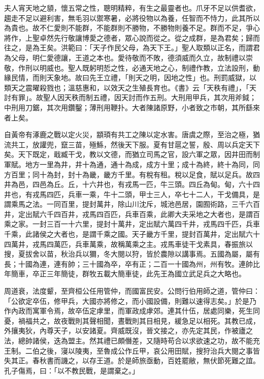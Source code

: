 
\begin{pinyinscope}
夫人宵天地之䫉，懷五常之性，聰明精粹，有生之最靈者也。爪牙不足以供耆欲，趨走不足以避利害，無毛羽以禦寒暑，必將役物以為養，任智而不恃力，此其所以為貴也。故不仁愛則不能群，不能群則不勝物，不勝物則養不足。群而不足，爭心將作，上聖卓然先行敬讓博愛之德者，眾心說而從之。從之成群，是為君矣；歸而往之，是為王矣。洪範曰：「天子作民父母，為天下王。」聖人取類以正名，而謂君為父母，明仁愛德讓，王道之本也。愛待敬而不敗，德須威而久立，故制禮以崇敬，作刑以明威也。聖人既躬明悊之性，必通天地之心，制禮作教，立法設刑，動緣民情，而則天象地。故曰先王立禮，「則天之明，因地之性」也。刑罰威獄，以類天之震曜殺戮也；溫慈惠和，以效天之生殖長育也。《書》云「天秩有禮」，「天討有罪」。故聖人因天秩而制五禮，因天討而作五刑。大刑用甲兵，其次用斧鉞；中刑用刀鋸，其次用鑽鑿；薄刑用鞭扑。大者陳諸原野，小者致之市朝，其所繇來者上矣。

自黃帝有涿鹿之戰以定火災，顓頊有共工之陳以定水害。唐虞之際，至治之極，猶流共工，放讙兜，竄三苗，殛鯀，然後天下服。夏有甘扈之誓，殷、周以兵定天下矣。天下既定，戢臧干戈，教以文德，而猶立司馬之官，設六軍之眾，因井田而制軍賦。地方一里為井，井十為通，通十為成，成方十里；成十為終，終十為同，同方百里；同十為封，封十為畿，畿方千里。有稅有租。稅以足食，賦以足兵。故四井為邑，四邑為丘。丘，十六井也，有戎馬一匹，牛三頭。四丘為甸。甸，六十四井也，有戎馬四匹，兵車一乘，牛十二頭，甲士三人，卒七十二人，干戈備具，是謂乘馬之法。一同百里，提封萬井，除山川沈斥，城池邑居，園囿術路，三千六百井，定出賦六千四百井，戎馬四百匹，兵車百乘，此卿大夫采地之大者也，是謂百乘之家。一封三百一十六里，提封十萬井，定出賦六萬四千井，戎馬四千匹，兵車千乘，此諸侯之大者也，是謂千乘之國。天子畿方千里，提封百萬井，定出賦六十四萬井，戎馬四萬匹，兵車萬乘，故稱萬乘之主。戎馬車徒干戈素具，春振旅以搜，夏拔舍以苗，秋治兵以獮，冬大閱以狩，皆於農隙以講事焉。五國為屬，屬有長；十國為連，連有帥；三十國為卒，卒有正；二百一十國為州，州有牧。連帥比年簡車，卒正三年簡徒，群牧五載大簡車徒，此先王為國立武足兵之大略也。

周道衰，法度颦，至齊桓公任用管仲，而國富民安。公問行伯用師之道，管仲曰：「公欲定卒伍，修甲兵，大國亦將修之，而小國設備，則難以速得志矣。」於是乃作內政而寓軍令焉，故卒伍定虖里，而軍政成虖郊。連其什伍，居處同樂，死生同憂，禍福共之，故夜戰則其聲相聞，晝戰則其目相見，緩急足以相死。其教已成，外攘夷狄，內尊天子，以安諸夏。齊威既沒，晉文接之，亦先定其民，作被廬之法，總帥諸侯，迭為盟主。然其禮已頗僭差，又隨時苟合以求欲速之功，故不能充王制。二伯之後，寖以陵夷，至魯成公作丘甲，哀公用田賦，搜狩治兵大閱之事皆失其正。春秋書而譏之，以存王道。於是師旅亟動，百姓罷敝，無伏節死難之誼。孔子傷焉，曰：「以不教民戰，是謂棄之。」


\end{pinyinscope}
